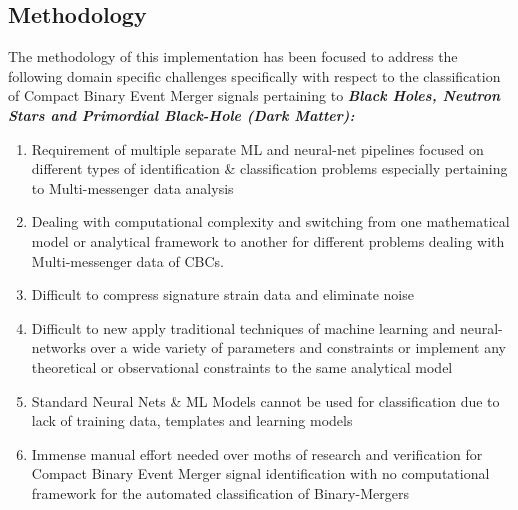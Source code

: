     \subsection{Methodology}
    The methodology of this implementation has been focused to address the following domain specific challenges specifically with respect to the classification of Compact Binary Event Merger signals pertaining to \textbf{\textit{Black Holes, Neutron Stars and Primordial Black-Hole (Dark Matter):}}

    \begin{enumerate}
    
        \item {Requirement of multiple separate ML and neural-net pipelines focused on different types of identification \& classification problems especially pertaining to Multi-messenger data analysis }
        \item {Dealing with computational complexity and  switching from one mathematical model or analytical framework to another for different problems dealing with Multi-messenger data of CBCs.}
        \item {Difficult to compress signature strain data and eliminate noise}
        \item {Difficult to new apply traditional techniques of machine learning and neural-networks over a wide variety of parameters and constraints or implement any theoretical or observational constraints to the same analytical model}
        \item {Standard Neural Nets \& ML Models cannot be used for classification due to lack of training data, templates and learning models}
        \item {Immense manual effort needed over moths of research and verification for Compact Binary Event Merger signal identification with no computational framework for the automated classification of Binary-Mergers}
        
    \end{enumerate}

